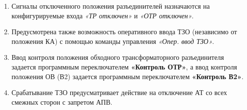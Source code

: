 \begin{enumerate}
\item
Сигналы отключенного положения разъединителей назначаются на конфигурируемые входа \textit{«ТР отключен»} и \textit{«ОТР отключен»}.

\item
Предусмотрена также возможность оперативного ввода ТЗО (независимо от положения КА) с помощью команды управления \textit{«Опер. ввод ТЗО»}.

\item
Ввод контроля положения обходного трансформаторного разъединителя задается программным переключателем \textbf{«Контроль ОТР»}, а ввод контроля положения ОВ (В2) задается программным переключателем \textbf{«Контроль В2»}.

\item
Срабатывание ТЗО предусматривает действие на отключение АТ со всех смежных сторон с запретом АПВ.

\end{enumerate} 